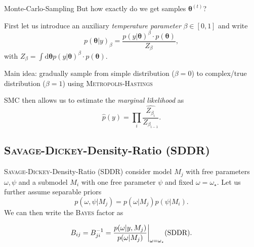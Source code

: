 \documentclass[11pt,aspectratio=1610,dvipsnames]{beamer}
\newcommand{\btheta}{\boldsymbol{\theta}}
\begin{document}
\begin{frame}{Monte-Carlo-Sampling}
	But how exactly do we get samples $\btheta^{(t)}$?
			\begin{tcolorbox}[colback=black!5,colframe=gray!15!black,title={Sequential Monte Carlo (SMC)}]
				First let us introduce an auxiliary \emph{temperature parameter} $\beta\in [0,1]$ and write
				$$p(\btheta|y)_\beta=\frac{p(y|\btheta)^\beta\cdot p(\btheta)}{Z_\beta},$$
				with $Z_\beta=\int\text{d}\btheta p(y|\btheta)^\beta\cdot p(\btheta)$.
				
				Main idea: gradually sample from simple distribution ($\beta=0$) to complex/true distribution ($\beta=1$) using \textsc{Metropolis-Hastings}
				
				SMC then allows us to estimate the \emph{marginal likelihood} as 
				\begin{equation}\label{eq:with_the_hat}
				\hat{p}(y)=\prod_{i}\widehat{\frac{Z_{\beta_i}}{Z_{\beta_{i-1}}}}.
				\end{equation}
				\raggedleft
				\small\citet{SMC_PEPE,PyMC3_SMC}
		\end{tcolorbox}
	
\end{frame}


\subsection{\textsc{Savage-Dickey}-Density-Ratio (SDDR)}
\begin{frame}{\textsc{Savage-Dickey}-Density-Ratio (SDDR)}
	consider model $M_j$ with free parameters $\omega,\psi$ and a submodel $M_i$ with one free parameter $\psi$ and fixed $\omega=\omega_\star$. Let us further assume separable priors $$p(\omega,\psi|M_j)=p(\omega|M_j)p(\psi|M_i).$$
	We can then write the \textsc{Bayes} factor as 
	
\begin{tcolorbox}[colback=black!5,colframe=gray!15!black,title={Savage Dickey-Density-Ratio}]
	\begin{equation}
	\label{eq:sddr}
	B_{ij}=B_{ji}^{-1}=\frac{p(\omega|y,M_j)}{p(\omega|M_j)}\bigg|_{\omega=\omega_\star}  \text{\hfill (SDDR)}.
	\end{equation}
\end{tcolorbox}
\raggedleft
\citet{trotta}
\end{frame}
%
\end{document}
